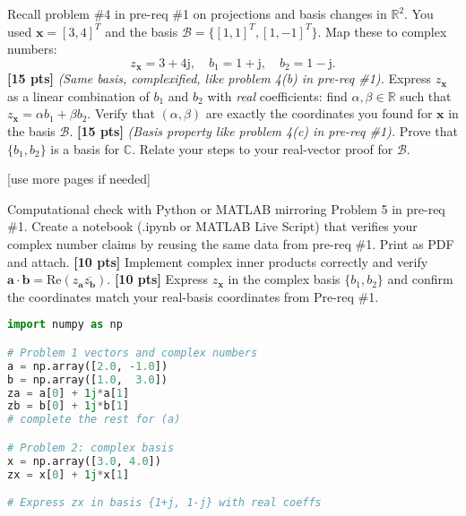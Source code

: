 \documentclass{ee102_pset}
\begin{document}
 Recall problem \#4 in pre-req \#1 on projections and basis changes in $\mathbb{R}^2$. You used $\mathbf{x}=[3,4]^T$ and the basis $\mathcal{B}=\{[1,1]^T,[1,-1]^T\}$. Map these to complex numbers:
\[
z_{\mathbf{x}}=3+4\mathrm{j},\quad b_1=1+\mathrm{j},\quad b_2=1-\mathrm{j}.
\]
\problempart \textbf{[15 pts]} \emph{(Same basis, complexified, like problem 4(b) in pre-req \#1).} Express $z_{\mathbf{x}}$ as a linear combination of $b_1$ and $b_2$ with \emph{real} coefficients: find $\alpha,\beta\in\mathbb{R}$ such that $z_{\mathbf{x}}=\alpha b_1+\beta b_2$. Verify that $(\alpha,\beta)$ are exactly the coordinates you found for $\mathbf{x}$ in the basis $\mathcal{B}$.
\problempart \textbf{[15 pts]} \emph{(Basis property like problem 4(c) in pre-req \#1).} Prove that $\{b_1,b_2\}$ is a basis for $\mathbb{C}$. Relate your steps to your real-vector proof for $\mathcal{B}$.

\vspace*{\fill}
\begin{center}
[use more pages if needed]
\end{center}

 Computational check with Python or MATLAB mirroring Problem 5 in pre-req \#1. Create a notebook (.ipynb or MATLAB Live Script) that verifies your complex number claims by reusing the same data from pre-req \#1. Print as PDF and attach.
\problempart \textbf{[10 pts]} Implement complex inner products correctly and verify
$\mathbf{a}\cdot\mathbf{b}=\mathrm{Re}\!\left(z_{\mathbf{a}}\overline{z_{\mathbf{b}}}\right)$.
\problempart \textbf{[10 pts]} Express $z_{\mathbf{x}}$ in the complex basis $\{b_1,b_2\}$ and confirm the coordinates match your real-basis coordinates from Pre-req \#1.

\begin{lstlisting}[language=Python, caption=Starter code for Problem 3]
import numpy as np

# Problem 1 vectors and complex numbers
a = np.array([2.0, -1.0])
b = np.array([1.0,  3.0])
za = a[0] + 1j*a[1]
zb = b[0] + 1j*b[1]
# complete the rest for (a)

# Problem 2: complex basis
x = np.array([3.0, 4.0])
zx = x[0] + 1j*x[1]

# Express zx in basis {1+j, 1-j} with real coeffs

\end{lstlisting}
\end{document}

